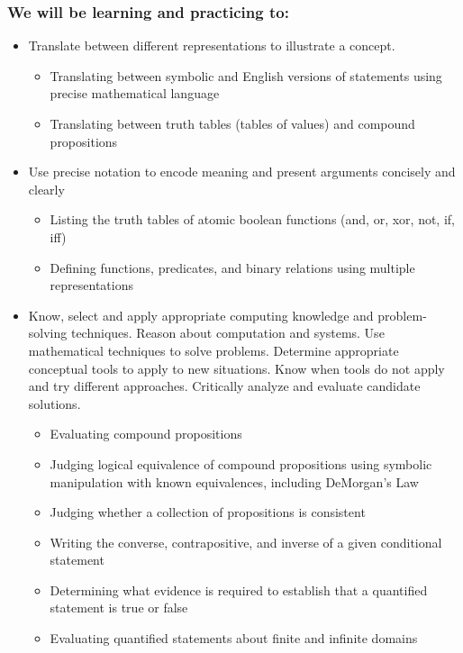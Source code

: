 \subsubsection*{We will be learning and practicing to:}
\begin{itemize}

\item Translate between different representations to illustrate a concept.
\begin{itemize}
   \item Translating between symbolic and English versions of statements using precise mathematical language
   \item Translating between truth tables (tables of values) and compound propositions
\end{itemize}

\item Use precise notation to encode meaning and present arguments concisely and clearly
\begin{itemize}
    \item Listing the truth tables of atomic boolean functions (and, or, xor, not, if, iff)
    \item Defining functions, predicates, and binary relations using multiple representations
\end{itemize}

\item Know, select and apply appropriate computing knowledge and problem-solving techniques. Reason about computation and systems. Use mathematical techniques to solve problems. Determine appropriate conceptual tools to apply to new situations. Know when tools do not apply and try different approaches. Critically analyze and evaluate candidate solutions.
\begin{itemize}
    \item Evaluating compound propositions
    \item Judging logical equivalence of compound propositions using symbolic manipulation with known equivalences, including DeMorgan's Law
    \item Judging whether a collection of propositions is consistent
    \item Writing the converse, contrapositive, and inverse of a given conditional statement
    \item Determining what evidence is required to establish that a quantified statement is true or false
    \item Evaluating quantified statements about finite and infinite domains
\end{itemize}

\end{itemize}

